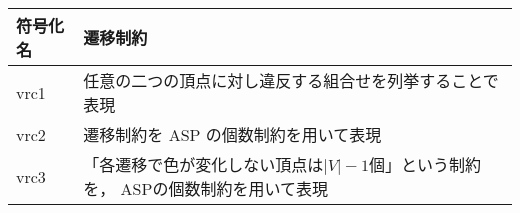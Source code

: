 \begin{tabular}{l|p{8cm}}
  符号化名 & 遷移制約 \\\hline
  vrc1 & 任意の二つの頂点に対し違反する組合せを列挙することで表現  \\ \hline
  vrc2 & 遷移制約を ASP の個数制約を用いて表現\\\hline
  vrc3 & 「各遷移で色が変化しない頂点は$|V|-1$個」という制約を，
         ASPの個数制約を用いて表現
\end{tabular}